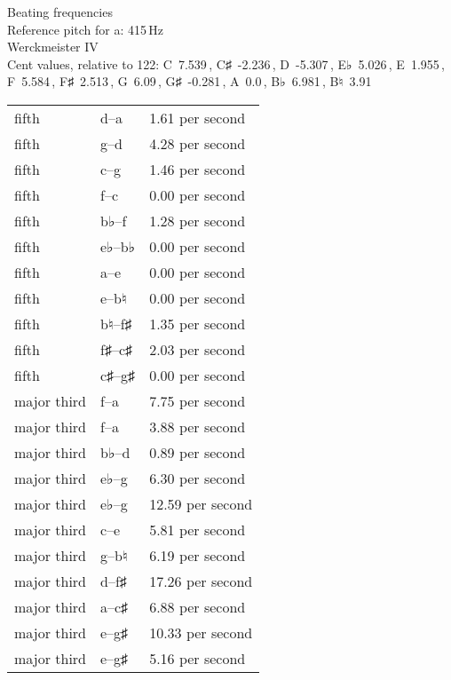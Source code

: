 \documentclass{standalone}
\def\str{\textquotesingle}
\def\cn{\textcent}
\begin{document}
\begin{minipage}{8cm}
\begin{center}
  {\Large Beating frequencies}\\[2ex]
  Reference pitch for a\str: 415\,Hz\\[1ex]
  Werckmeister IV\\[1ex]
  Cent values, relative to 122: C~7.539\,\cn, C♯~-2.236\,\cn, D~-5.307\,\cn, E♭~5.026\,\cn, E~1.955\,\cn, F~5.584\,\cn, F♯~2.513\,\cn, G~6.09\,\cn, G♯~-0.281\,\cn, A~0.0\,\cn, B♭~6.981\,\cn, B♮~3.91\,\cn
\end{center}
\begin{longtable}{p{2cm}p{1cm}p{3cm}}
  \toprule
  fifth & d\str--a\str & 1.61 per second \\fifth & g--d\str & 4.28 per second \\fifth & c\str--g\str & 1.46 per second \\fifth & f--c\str & 0.00 per second \\fifth & b♭--f\str & 1.28 per second \\fifth & e♭--b♭ & 0.00 per second \\fifth & a--e\str & 0.00 per second \\fifth & e--b♮ & 0.00 per second \\fifth & b♮--f♯\str & 1.35 per second \\fifth & f♯--c♯\str & 2.03 per second \\fifth & c♯\str--g♯\str & 0.00 per second \\major third & f\str--a\str & 7.75 per second \\major third & f--a & 3.88 per second \\major third & b♭--d\str & 0.89 per second \\major third & e♭--g & 6.30 per second \\major third & e♭\str--g\str & 12.59 per second \\major third & c\str--e\str & 5.81 per second \\major third & g--b♮ & 6.19 per second \\major third & d\str--f♯\str & 17.26 per second \\major third & a--c♯\str & 6.88 per second \\major third & e\str--g♯\str & 10.33 per second \\major third & e--g♯ & 5.16 per second \\
  \bottomrule
\end{longtable}
\end{minipage}
\end{document}
